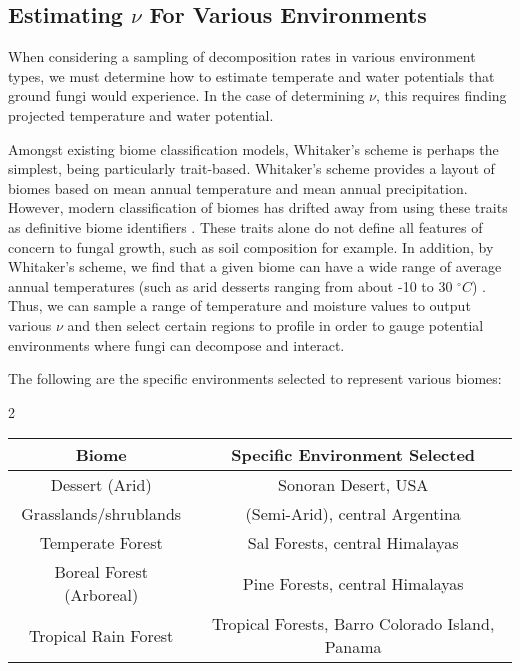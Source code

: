 \documentclass[12pt]{article}
\begin{document}
\begin{multicols}{2}
\subsection{Estimating $\nu$ For Various Environments}

When considering a sampling of decomposition rates in various environment types, we must determine how to estimate temperate and water potentials that ground fungi would experience. In the case of determining $\nu$, this requires finding projected temperature and water potential.


Amongst existing biome classification models, Whitaker's scheme \cite{Whittaker1970} is perhaps the simplest, being particularly trait-based. Whitaker's scheme provides a layout of biomes based on mean annual temperature and mean annual precipitation. However, modern classification of biomes has drifted away from using these traits as definitive biome identifiers \cite{Mucina2018}. These traits alone do not define all features of concern to fungal growth, such as soil composition for example. In addition, by Whitaker's scheme, we find that a given biome can have a wide range of average annual temperatures (such as arid desserts ranging from about -10 to 30 $^{\circ}C$) \cite{Whittaker1970}. Thus, we can sample a range of temperature and moisture values to output various $\nu$ and then select certain regions to profile in order to gauge potential environments where fungi can decompose and interact.

The following are the specific environments selected to represent various biomes:

\end{multicols}{2}
\begin{savenotes}
	\begin{table}[H]
		\begin{center}
			\begin{tabular}{|c c|} 
				\hline
				Biome & Specific Environment Selected \\ [0.5ex] 
				\hline\hline
				Dessert (Arid) & Sonoran Desert, USA \\ 
				\hline
				Grasslands/shrublands & (Semi-Arid), central Argentina\\
				\hline
				Temperate Forest & Sal Forests, central Himalayas\\
				\hline
				Boreal Forest (Arboreal) & Pine Forests, central Himalayas\\
				\hline
				Tropical Rain Forest & Tropical Forests, Barro Colorado Island, Panama \\
				\hline
			\end{tabular}
		\end{center}
	\end{table}
\end{savenotes}
\end{document}
